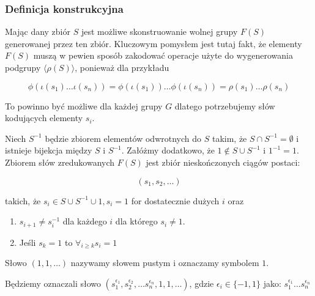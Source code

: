 \subsubsection{Definicja konstrukcyjna}
Mając dany zbiór $S$ jest możliwe skonstruowanie wolnej grupy $F(S)$ generowanej
przez ten zbiór. Kluczowym pomysłem jest tutaj fakt, że elementy $F(S)$ muszą w
pewien sposób zakodować operacje użyte do wygenerowania podgrupy
$\langle \rho(S) \rangle$, ponieważ dla przykładu

\[
\phi\left(\iota\left(s_1\right) \ldots \iota\left(s_n\right)\right)
=
\phi\left(\iota\left(s_1\right)\right) \ldots \phi\left(\iota\left(s_n\right)\right)
=
\rho\left(s_1\right)\ldots\rho\left(s_n\right)\]

To powinno być możliwe dla każdej grupy $G$ dlatego potrzebujemy słów kodujących
elementy $s_i$.

\begin{defin}
  Niech $S^{-1}$ będzie zbiorem elementów odwrotnych do $S$ takim, że $S \cap
  S^{-1} = \emptyset$ i istnieje bijekcja między $S$ i $S^{-1}$. Załóżmy
  dodatkowo, że $1 \not \in S \cup S^{-1}$ i $1^{-1} = 1$.  Zbiorem słów
  zredukowanych $F(S)$ jest zbiór nieskończonych ciągów postaci:

  \[(s_1, s_2, \ldots)\]

  takich, że $s_i \in S \cup S^{-1} \cup {1}, s_i = 1$ for dostatecznie dużych
  $i$ oraz

\begin{enumerate}
  \item $s_{i+1} \neq s_i^{-1}$ dla każdego $i$ dla którego $s_i \neq 1$.
  \item Jeśli $s_k = 1$ to $\forall_{i \geq k} s_i = 1$
\end{enumerate}
\end{defin}

Słowo $(1,1,\ldots)$ nazywamy słowem pustym i oznaczamy symbolem $1$.

Będziemy oznaczali słowo $
(s_1^{\epsilon_1},
s_2^{\epsilon_2}, \ldots
s_n^{\epsilon_n}, 1, 1, \ldots)$, gdzie $\epsilon_i \in \{-1, 1\}$ jako: 
$s_1^{\epsilon_1}\ldots s_n^{\epsilon_n}$

